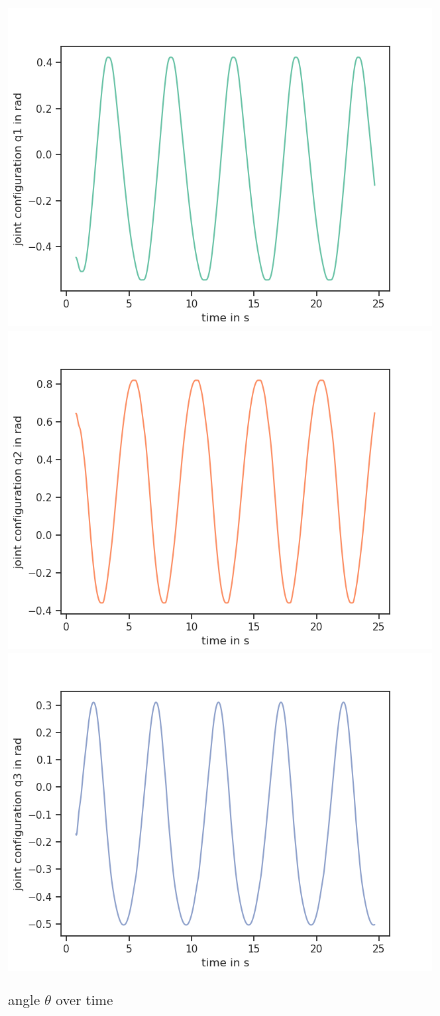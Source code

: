 \documentclass[a4paper,10pt]{article}
\begin{document}
\begin{figure}[H]
  \centering
  \includegraphics[scale=0.6]{img/C3_theta0}
  \includegraphics[scale=0.6]{img/C3_theta1}
  \includegraphics[scale=0.6]{img/C3_theta2}
  \caption{angle $\theta$ over time}
\end{figure}
\end{document}
